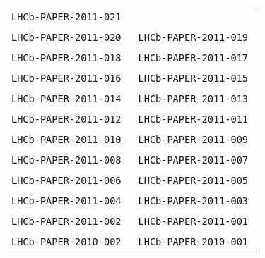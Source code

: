\begin{center}
\begin{longtable}{ll}
\texttt{LHCb-PAPER-2011-021}~\cite{LHCb-PAPER-2011-021} \\
\texttt{LHCb-PAPER-2011-020}~\cite{LHCb-PAPER-2011-020} &
\texttt{LHCb-PAPER-2011-019}~\cite{LHCb-PAPER-2011-019} \\
\texttt{LHCb-PAPER-2011-018}~\cite{LHCb-PAPER-2011-018} &
\texttt{LHCb-PAPER-2011-017}~\cite{LHCb-PAPER-2011-017} \\
\texttt{LHCb-PAPER-2011-016}~\cite{LHCb-PAPER-2011-016} &
\texttt{LHCb-PAPER-2011-015}~\cite{LHCb-PAPER-2011-015} \\
\texttt{LHCb-PAPER-2011-014}~\cite{LHCb-PAPER-2011-014} &
\texttt{LHCb-PAPER-2011-013}~\cite{LHCb-PAPER-2011-013} \\
\texttt{LHCb-PAPER-2011-012}~\cite{LHCb-PAPER-2011-012} &
\texttt{LHCb-PAPER-2011-011}~\cite{LHCb-PAPER-2011-011} \\
\texttt{LHCb-PAPER-2011-010}~\cite{LHCb-PAPER-2011-010} &
\texttt{LHCb-PAPER-2011-009}~\cite{LHCb-PAPER-2011-009} \\
\texttt{LHCb-PAPER-2011-008}~\cite{LHCb-PAPER-2011-008} &
\texttt{LHCb-PAPER-2011-007}~\cite{LHCb-PAPER-2011-007} \\
\texttt{LHCb-PAPER-2011-006}~\cite{LHCb-PAPER-2011-006} &
\texttt{LHCb-PAPER-2011-005}~\cite{LHCb-PAPER-2011-005} \\
\texttt{LHCb-PAPER-2011-004}~\cite{LHCb-PAPER-2011-004} &
\texttt{LHCb-PAPER-2011-003}~\cite{LHCb-PAPER-2011-003} \\
\texttt{LHCb-PAPER-2011-002}~\cite{LHCb-PAPER-2011-002} &
\texttt{LHCb-PAPER-2011-001}~\cite{LHCb-PAPER-2011-001} \\
\hline
\texttt{LHCb-PAPER-2010-002}~\cite{LHCb-PAPER-2010-002} &
\texttt{LHCb-PAPER-2010-001}~\cite{LHCb-PAPER-2010-001} \\
\hline
\end{longtable}
\end{center}

